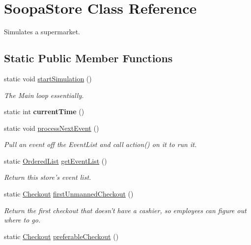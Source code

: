 \hypertarget{class_soopa_store}{
\section{SoopaStore Class Reference}
\label{class_soopa_store}
}
Simulates a supermarket.  


\subsection*{Static Public Member Functions}
\begin{CompactItemize}
\item 
static void \hyperlink{class_soopa_store_0aad33c6987dcb01206d9dca916b8f6e}{startSimulation} ()
\begin{CompactList}\small\item\em The Main loop essentially. \item\end{CompactList}\item 
\hypertarget{class_soopa_store_a3379b3f69cf90bc2ec53d6a091845fa}{
static int \textbf{currentTime} ()}
\label{class_soopa_store_a3379b3f69cf90bc2ec53d6a091845fa}

\item 
static void \hyperlink{class_soopa_store_084115ff6adac00d13503ea1f3dc8cb9}{processNextEvent} ()
\begin{CompactList}\small\item\em Pull an event off the EventList and call action() on it to run it. \item\end{CompactList}\item 
static \hyperlink{class_ordered_list}{OrderedList} \hyperlink{class_soopa_store_cb13f3037f1ccb3e1ff74527ed2d5a68}{getEventList} ()
\begin{CompactList}\small\item\em Return this store's event list. \item\end{CompactList}\item 
\hypertarget{class_soopa_store_3420dc46c01f9a26a78e6b39065449e8}{
static \hyperlink{class_checkout}{Checkout} \hyperlink{class_soopa_store_3420dc46c01f9a26a78e6b39065449e8}{firstUnmannedCheckout} ()}
\label{class_soopa_store_3420dc46c01f9a26a78e6b39065449e8}

\begin{CompactList}\small\item\em Return the first checkout that doesn't have a cashier, so employees can figure out where to go. \item\end{CompactList}\item 
\hypertarget{class_soopa_store_ab26ca28144f3c443e7aa57e9ff3bc44}{
static \hyperlink{class_checkout}{Checkout} \hyperlink{class_soopa_store_ab26ca28144f3c443e7aa57e9ff3bc44}{preferableCheckout} ()}
\label{class_soopa_store_ab26ca28144f3c443e7aa57e9ff3bc44}


\end{CompactItemize}
